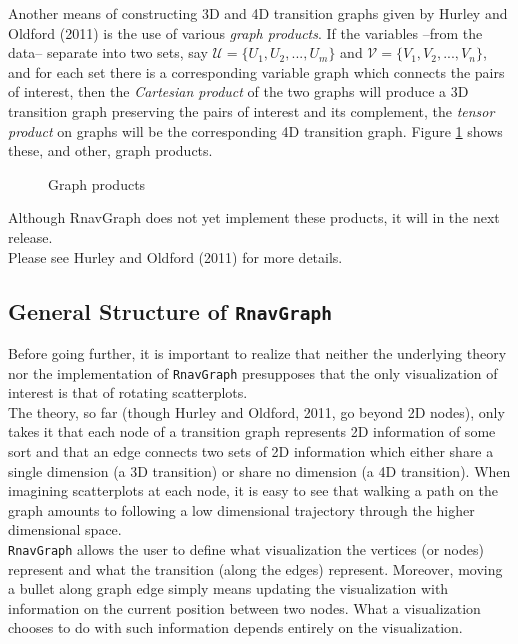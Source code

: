 \documentclass[12pt,oneside,titlepage,letter]{article}
\begin{document}
Another means of constructing 3D and 4D transition graphs given by Hurley and Oldford (2011) is the use of various {\em graph products}.
If the variables --from the data-- separate into two sets, say $\mathcal{U} = \{U_1,U_2,...,U_m\}$ and $\mathcal{V} = \{V_1,V_2,...,V_n\}$, and for each set there is a corresponding variable graph which connects the pairs of interest, then the {\em Cartesian product} of the two graphs will produce a 3D transition graph preserving the pairs of interest and its complement, the {\em tensor product} on graphs will be the corresponding 4D transition graph.
Figure \ref{fig:prduct} shows these, and other, graph products.
\begin{figure}[h]
  \begin{tiny}
    \begin{center}
      
    \end{center}  
  \end{tiny}  
  \caption{Graph products}
  \label{fig:prduct}
\end{figure}
Although RnavGraph does not yet implement these products, it will in the next release.\\

Please see Hurley and Oldford (2011) for more details.

\subsection{General Structure of \texttt{RnavGraph} }
Before going further, it is important to realize that neither the underlying theory nor the implementation of \texttt{RnavGraph} presupposes that the only visualization of interest is that of
rotating scatterplots.\\

The theory, so far (though Hurley and Oldford, 2011, go beyond 2D nodes), only takes it that each
node of a transition graph represents 2D information of some sort and that an edge connects
two sets of 2D information which either share a single dimension (a 3D transition) or share no dimension (a 4D transition).  When imagining scatterplots at each node, it is easy to see that walking a path on the graph amounts to following a low dimensional trajectory through the higher dimensional space.\\

\texttt{RnavGraph} allows the user to define what visualization the vertices (or nodes) represent and what the transition (along the edges) represent.   Moreover, moving a bullet along  graph edge simply means updating the visualization with information on the current position between two nodes.
What a visualization chooses to do with such information depends entirely on the visualization.\\
\end{document}
